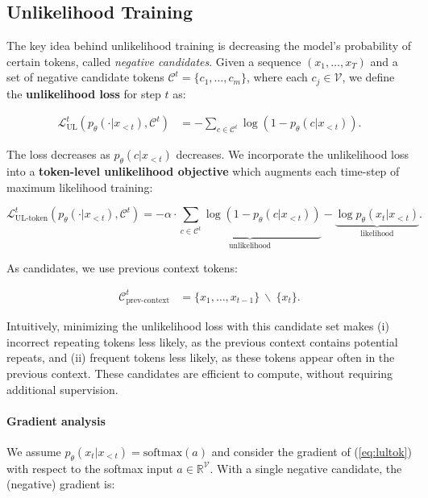 \subsection{Unlikelihood Training}
\label{ssec:token-obj} 
The key idea behind unlikelihood training is decreasing the model's probability of certain tokens, called \textit{negative candidates}. Given a sequence $(x_1,\ldots,x_T)$ and a set of negative candidate tokens $\mathcal{C}^t=\{c_1,\ldots,c_m\}$, where each $c_j\in \mathcal{V}$, we define the \textbf{unlikelihood loss} for step $t$ as:

\begin{align}
\mathcal{L}_{\text{UL}}^t(p_{\theta}(\cdot|x_{<t}), \mathcal{C}^t) &= -\sum_{c\in \mathcal{C}^t}\log (1-p_{\theta}(c|x_{<t})).
\end{align}

The loss decreases as $p_{\theta}(c|x_{<t})$ decreases. We incorporate the unlikelihood loss into a 
\textbf{token-level unlikelihood objective} which augments each time-step of maximum likelihood training:

\begin{equation} 
\label{eq:lultok}
    \mathcal{L}_{\text{UL-token}}^t(p_{\theta}(\cdot|x_{<t}), \mathcal{C}^t) = -\alpha \cdot\underbrace{\sum_{c\in \mathcal{C}^t} \log (1-p_{\theta}(c|x_{<t}))}_{\text{unlikelihood}} - \underbrace{\log p_{\theta}(x_t|x_{<t})}_{\text{likelihood}}.
\end{equation}

As candidates, we use previous context tokens:

\begin{align}
    \label{eq:cand-pc}
    \mathcal{C}_{\text{prev-context}}^t &= \{x_1,\ldots,x_{t-1}\}\ \backslash\  \{x_t\}.
\end{align}

Intuitively, minimizing the unlikelihood loss with this candidate set makes (i) incorrect repeating tokens less likely, as the previous context contains potential repeats, and (ii) frequent tokens less likely, as these tokens appear often in the previous context. These candidates are efficient to compute, without requiring additional supervision.

\paragraph{Gradient analysis} We assume $p_{\theta}(x_t|x_{<t})=\text{softmax}(a)$ and consider the gradient of (\ref{eq:lultok}) with respect to the softmax input $a\in\mathbb{R}^\mathcal{V}$. With a single negative candidate, the (negative) gradient is:

